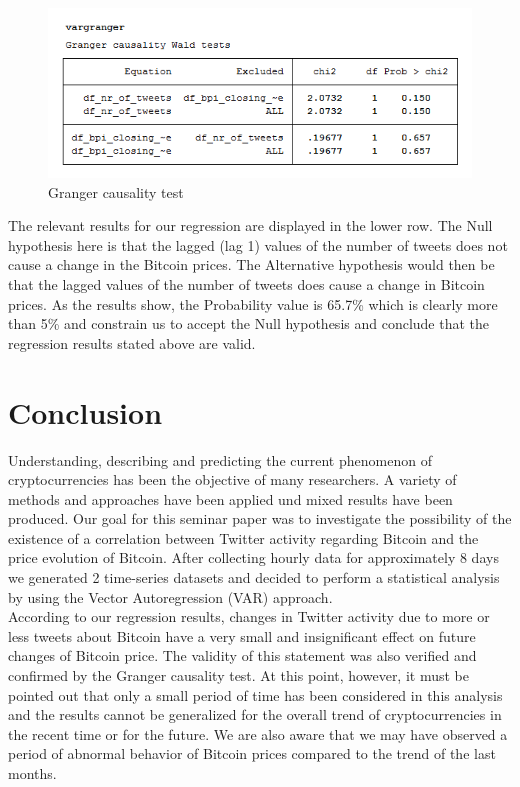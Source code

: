 \documentclass[a4paper,american,12pt]{article}
\begin{document}
\begin{spacing}{1.2}
\begin{figure}[H]
\centering
\includegraphics[scale=0.85]{stata_export_graphs/granger_test.png}
\caption{Granger causality test}
\label{fig:6}
\end{figure}

The relevant results for our regression are displayed in the lower row. The Null hypothesis here is that the lagged (lag 1) values of the number of tweets does not cause a change in the Bitcoin prices. The Alternative hypothesis would then be that the lagged values of the number of tweets does cause a change in Bitcoin prices. As the results show, the Probability value is 65.7\% which is clearly more than 5\% and constrain us to accept the Null hypothesis and conclude that the regression results stated above are valid.\\

\clearpage

\section{Conclusion}
\label{sec:Conclustion}
Understanding, describing and predicting the current phenomenon of cryptocurrencies has been the objective of many researchers. A variety of methods and approaches have been applied und mixed results have been produced. Our goal for this seminar paper was to investigate the possibility of the existence of a correlation between Twitter activity regarding Bitcoin and the price evolution of Bitcoin. After collecting hourly data for approximately 8 days we generated 2 time-series datasets and decided to perform a statistical analysis by using the Vector Autoregression (VAR) approach.\\

According to our regression results, changes in Twitter activity due to more or less tweets about Bitcoin have a very small and insignificant effect on future changes of Bitcoin price. The validity of this statement was also verified and confirmed by the Granger causality test. At this point, however, it must be pointed out that only a small period of time has been considered in this analysis and the results cannot be generalized for the overall trend of cryptocurrencies in the recent time or for the future. We are also aware that we may have observed a period of abnormal behavior of Bitcoin prices compared to the trend of the last months.\\


\end{spacing}
\end{document}
